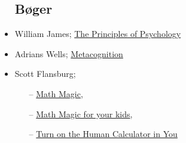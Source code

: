 \begin{itemize}
\subsection{Bøger}
    \item William James; \href{https://www.saxo.com/dk/the-principles-of-psychology_william-james_paperback_9781515011767}{The Principles of Psychology}
    \item  Adrians Wells; \href{https://www.saxo.com/dk/metacognitive-therapy_peter-fisher_paperback_9780415434997}{Metacognition}
    \item  Scott Flansburg;
        \begin{itemize}
            \item[--] \href{https://www.saxo.com/dk/math-magic-revised-edition_scott-flansburg-victoria-hay_paperback_9780060726355}{Math Magic},
            \item[--] \href{https://www.saxo.com/dk/math-magic-for-your-kids_scott-flansburg_paperback_9780060977313}{Math Magic for your kids},
            \item[--] \href{https://www.saxo.com/dk/turn-on-the-human-calculator-in-you_scott-flansburg_paperback_9780988408425}{Turn on the Human Calculator in You}
        \end{itemize}
\end{itemize}